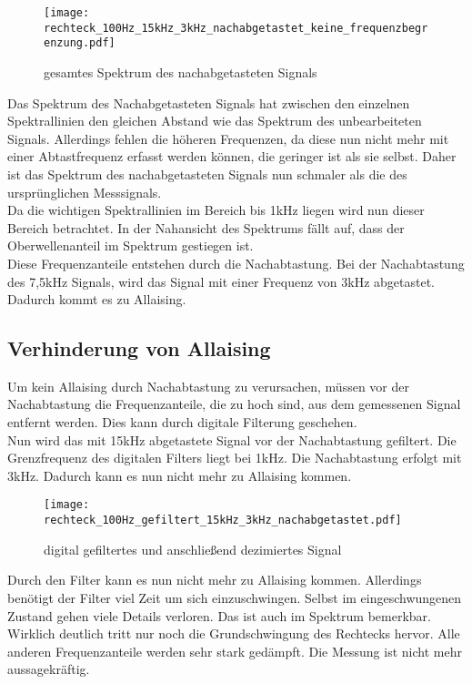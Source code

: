 \documentclass{article}%
\begin{document}
	\begin{figure}[htb]
		\centering
		\texttt{[image: rechteck\_100Hz\_15kHz\_3kHz\_nachabgetastet\_keine\_frequenzbegrenzung.pdf]}
		\caption{gesamtes Spektrum des nachabgetasteten Signals}
	\end{figure}	

	Das Spektrum des Nachabgetasteten Signals hat zwischen den einzelnen Spektrallinien den gleichen 
	Abstand wie das Spektrum des unbearbeiteten Signals. Allerdings fehlen die höheren Frequenzen, 
	da diese nun nicht mehr mit einer Abtastfrequenz erfasst werden können, die geringer ist als sie selbst. 
	Daher ist das Spektrum des nachabgetasteten Signals nun schmaler als die des ursprünglichen 
	Messsignals.\\

	Da die wichtigen Spektrallinien im Bereich bis 1kHz liegen wird nun dieser Bereich betrachtet. 
	In der Nahansicht des Spektrums fällt auf, dass der Oberwellenanteil im
	Spektrum gestiegen ist.\\
	Diese Frequenzanteile entstehen durch die Nachabtastung. Bei der Nachabtastung des 7,5kHz Signals, 
	wird das Signal mit einer Frequenz von 3kHz abgetastet. Dadurch kommt es zu Allaising.\\

\subsection{Verhinderung von Allaising}

	Um kein Allaising durch Nachabtastung zu verursachen, müssen vor der Nachabtastung die Frequenzanteile, 
	die zu hoch sind, aus dem gemessenen Signal entfernt werden. Dies kann durch
	digitale Filterung geschehen.\\

	Nun wird das mit 15kHz abgetastete Signal vor der Nachabtastung gefiltert. Die Grenzfrequenz des 
	digitalen Filters liegt bei 1kHz. Die Nachabtastung erfolgt mit 3kHz. Dadurch kann es nun nicht mehr 
	zu Allaising kommen. 

	\begin{figure}[htb]
		\centering
		\texttt{[image: rechteck\_100Hz\_gefiltert\_15kHz\_3kHz\_nachabgetastet.pdf]}
		\caption{digital gefiltertes und anschließend dezimiertes Signal}
	\end{figure}	

	Durch den Filter kann es nun nicht mehr zu Allaising kommen. Allerdings benötigt der Filter viel Zeit um sich 
	einzuschwingen. Selbst im eingeschwungenen Zustand gehen viele Details verloren.
	Das ist auch im Spektrum bemerkbar. Wirklich deutlich tritt nur noch die Grundschwingung des Rechtecks hervor. 
	Alle anderen Frequenzanteile werden sehr stark gedämpft. Die Messung ist nicht mehr aussagekräftig.
	
\end{document}

